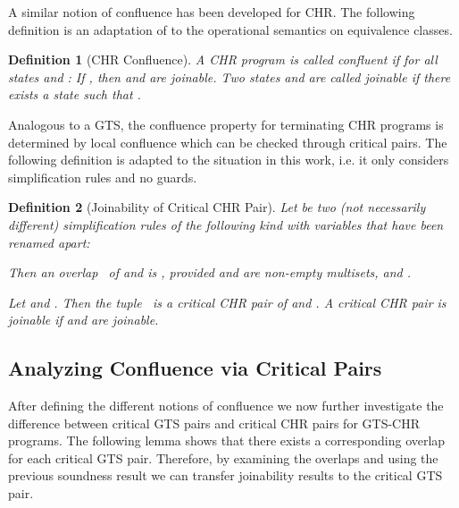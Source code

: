 \documentclass{tlp}
\newtheorem{definition}{Definition}[section]
\begin{document}
A similar notion of confluence has been developed for CHR. The following
definition is an adaptation of \cite{fruehwirth09} to the operational semantics
on equivalence classes.

\begin{definition}[CHR Confluence] A CHR program is called \emph{confluent} if
for all states  and : If , then  and  are joinable. Two states  and
 are called \emph{joinable} if there exists a state  such that
.
\end{definition}

Analogous to a GTS, the confluence property for terminating CHR programs is
determined by local confluence which can be checked through critical pairs. The
following definition is adapted to the situation in this work, i.e. it only
considers simplification rules and no guards.

\begin{definition}[Joinability of Critical CHR Pair]\label{def:chr_cp} Let  be two (not necessarily different) simplification rules of the following
kind with variables that have been renamed apart: 

Then an \emph{overlap}~ of  and  is , provided  and  are non-empty
multisets,  and .

Let  and
. Then the
tuple~ is a \emph{critical CHR pair} of  and
. A critical CHR pair  is \emph{joinable} if
 and  are joinable.
\end{definition}

\subsection{Analyzing Confluence via Critical Pairs}
\label{sec:confl_pairs}

After defining the different notions of confluence we now further investigate the
difference between critical GTS pairs and critical CHR pairs for GTS-CHR
programs. The following lemma shows that there exists a corresponding overlap for
each critical GTS pair. Therefore, by examining the overlaps and using the
previous soundness result we can transfer joinability results to the critical GTS
pair.
\end{document}
